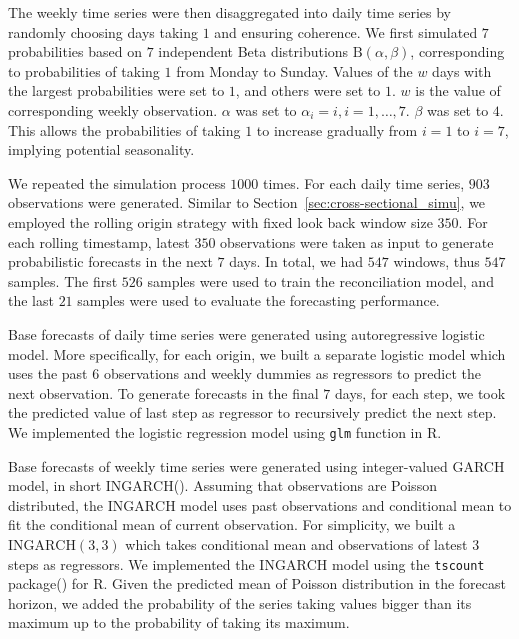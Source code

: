 \documentclass[a4paper,review,12pt,authoryear]{elsarticle}
\let\code=\texttt
\let\proglang=\textsf
\begin{document}
The weekly time series were then disaggregated into daily time series by randomly choosing days taking $1$ and ensuring coherence. 
We first simulated $7$ probabilities based on $7$ independent Beta distributions $\textrm{B}(\alpha, \beta)$, corresponding to probabilities of taking $1$ from Monday to Sunday. 
Values of the $w$ days with the largest probabilities were set to $1$, and others were set to $1$. $w$ is the value of corresponding weekly observation.
$\alpha$ was set to $\alpha_i = i, i=1,\dots,7$. $\beta$ was set to $4$. This allows the probabilities of taking $1$ to increase gradually from $i=1$ to $i=7$, implying potential seasonality.

We repeated the simulation process $1000$ times. For each daily time series, $903$ observations were generated. Similar to Section~\ref{sec:cross-sectional_simu}, we employed the rolling origin strategy  with fixed look back window size $350$. 
For each rolling timestamp, latest $350$ observations were taken as input to generate probabilistic forecasts in the next $7$ days. 
In total, we had $547$ windows, thus $547$ samples.
The first $526$ samples were used to train the reconciliation model, and the last $21$ samples were used to evaluate the forecasting performance.

Base forecasts of daily time series were generated using autoregressive logistic model. 
More specifically, for each origin, we built a separate logistic model which uses the past $6$ observations and weekly dummies as regressors to predict the next observation. 
To generate forecasts in the final $7$ days, for each step, we took the predicted value of last step as regressor to recursively predict the next step. We implemented the logistic regression model using \code{glm} function in \proglang{R}.

Base forecasts of weekly time series were generated using integer-valued GARCH model, in short $\textrm{INGARCH}$(). 
Assuming that observations are Poisson distributed, the $\textrm{INGARCH}$ model uses past observations and conditional mean to fit the conditional mean of current observation.
For simplicity, we built a $\textrm{INGARCH}(3, 3)$ which takes conditional mean and observations of latest $3$ steps as regressors. 
We implemented the $\textrm{INGARCH}$ model using the \code{tscount} package() for \proglang{R}.
Given the predicted mean of Poisson distribution in the forecast horizon, we added the probability of the series taking values bigger than its maximum up to the probability of taking its maximum.
\end{document}
